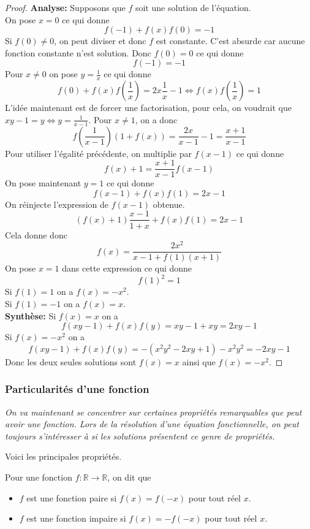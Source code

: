 \begin{proof}
\textbf{Analyse:} Supposons que $f$ soit une solution de l'équation.
\\
On pose $x=0$ ce qui donne 
$$f(-1)+f(x)f(0)=-1 $$ Si $f(0)\neq 0$, on peut diviser et donc $f$ est constante. C'est absurde car aucune fonction constante n'est solution. Donc $f(0)=0$ ce qui donne 
$$f(-1)=-1 $$
Pour $x\neq 0$ on pose $y=\frac{1}{x}$ ce qui donne 
$$f(0)+f(x)f\left(\frac{1}{x}\right)=2x\frac{1}{x}-1\iff f(x)f\left(\frac{1}{x}\right)=1 $$
L'idée maintenant est de forcer une factorisation, pour cela, on voudrait que $xy-1=y\iff y=\frac{1}{x-1}$. Pour $x\neq 1$, on a donc 
$$f\left(\frac{1}{x-1}\right)\left(1+f(x)\right)=\frac{2x}{x-1}-1=\frac{x+1}{x-1} $$
Pour utiliser l'égalité précédente, on multiplie par $f(x-1)$ ce qui donne 
$$f(x)+1=\frac{x+1}{x-1}f(x-1) $$
On pose maintenant $y=1$ ce qui donne 
$$f(x-1)+f(x)f(1)=2x-1 $$
On réinjecte l'expression de $f(x-1)$ obtenue.
$$(f(x)+1)\frac{x-1}{1+x} +f(x)f(1)=2x-1$$
Cela donne donc
$$f(x)=\frac{2x^2}{x-1+f(1)(x+1)}$$
On pose $x=1$ dans cette expression ce qui donne 
$$f(1)^2=1 $$
Si $f(1)=1$ on a $f(x)=-x^2$.
\\
Si $f(1)=-1$ on a $f(x)=x$.
\\
\textbf{Synthèse:} Si $f(x)=x$ on a 
$$f(xy-1)+f(x)f(y)=xy-1+xy=2xy-1 $$
Si $f(x)=-x^2$ on a 
$$f(xy-1)+f(x)f(y)=-(x^2y^2-2xy+1)-x^2y^2=-2xy-1 $$
Donc les deux seules solutions sont $f(x)=x$ ainsi que $f(x)=-x^2$.
\end{proof}



\subsubsection{Particularités d'une fonction}
\emph{On va maintenant se concentrer sur certaines propriétés remarquables que peut avoir une fonction. Lors de la résolution d'une équation fonctionnelle, on peut toujours s'intéresser à si les solutions présentent ce genre de propriétés. }

Voici les principales propriétés.

\begin{dfn}[Parité]
Pour une fonction $f:\mathbb{R}\to \mathbb{R}$, on dit que
\begin{itemize}
    \item $f$ est une fonction paire si $f(x)=f(-x)$ pour tout réel $x$.
    \item $f$ est une fonction impaire si $f(x)=-f(-x)$ pour tout réel $x$.
\end{itemize}

\end{dfn}

